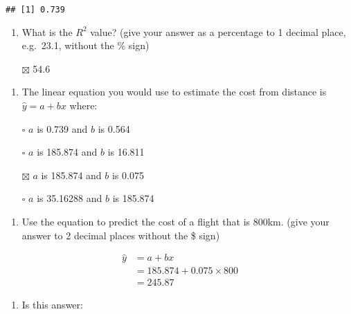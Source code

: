 \documentclass[
]{article}
\providecommand{\tightlist}{%
  \setlength{\itemsep}{0pt}\setlength{\parskip}{0pt}}
\begin{document}
\begin{verbatim}
## [1] 0.739
\end{verbatim}

\begin{enumerate}
\def\labelenumi{\alph{enumi}.}
\setcounter{enumi}{4}
\tightlist
\item
  What is the \(R^2\) value? (give your answer as a percentage to 1
  decimal place, e.g.~23.1, without the \% sign)
\end{enumerate}

\begin{itemize}
\tightlist
\item[$\boxtimes$]
  54.6
\end{itemize}

\begin{enumerate}
\def\labelenumi{\alph{enumi}.}
\setcounter{enumi}{5}
\tightlist
\item
  The linear equation you would use to estimate the cost from distance
  is \(\hat{y} = a + bx\) where:
\end{enumerate}

\begin{itemize}
\tightlist
\item[$\square$]
  \(a\) is 0.739 and \(b\) is 0.564
\item[$\square$]
  \(a\) is 185.874 and \(b\) is 16.811
\item[$\boxtimes$]
  \(a\) is 185.874 and \(b\) is 0.075
\item[$\square$]
  \(a\) is 35.16288 and \(b\) is 185.874
\end{itemize}

\begin{enumerate}
\def\labelenumi{\alph{enumi}.}
\setcounter{enumi}{6}
\tightlist
\item
  Use the equation to predict the cost of a flight that is 800km. (give
  your answer to 2 decimal places without the \$ sign)
\end{enumerate}

\[
  \begin{aligned}
    \hat{y} &= a + bx\\
    &= 185.874 + 0.075 \times 800\\
    &= 245.87
  \end{aligned}
\]

\begin{enumerate}
\def\labelenumi{\alph{enumi}.}
\setcounter{enumi}{7}
\tightlist
\item
  Is this answer:
\end{enumerate}
\end{document}
